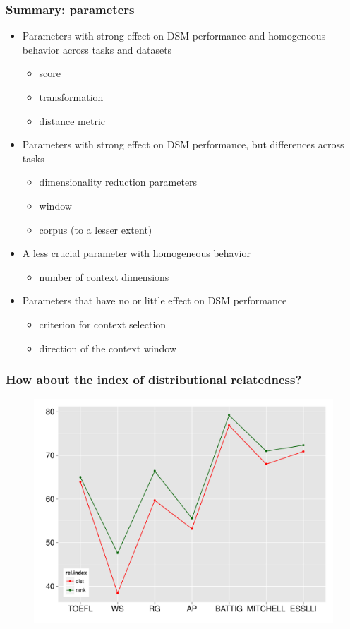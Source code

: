 \documentclass[t]{beamer} %
\begin{document}
\begin{frame}
  \frametitle{Summary: parameters}
  
  \ungap[1]
  \begin{itemize}
  \item Parameters with strong effect on DSM performance and homogeneous behavior across tasks and datasets
    \begin{itemize}
    \item score
    \item transformation
    \item distance metric
    \end{itemize}
  \item<2-> Parameters with strong effect on DSM performance, but differences across tasks
    \begin{itemize}
    \item dimensionality reduction parameters
    \item window
    \item corpus (to a lesser extent)
    \end{itemize}
  \item<3-> A less crucial parameter with homogeneous behavior
    \begin{itemize}
    \item number of context dimensions
    \end{itemize}
  \item<4-> Parameters that have no or little effect on DSM performance
    \begin{itemize}
    \item criterion for context selection
    \item direction of the context window
    \end{itemize}
  \end{itemize}
\end{frame}

\begin{frame}
  \frametitle{How about the index of distributional relatedness?}

  \begin{figure}
    \centering
    \includegraphics[scale=0.40]{img/lapesa_relindex_priming}
  \end{figure}   
  
\end{frame}
\end{document}
